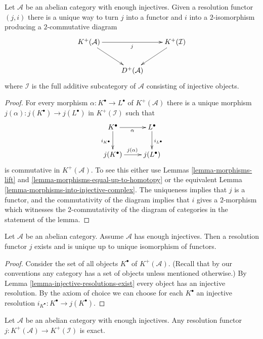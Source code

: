 \begin{lemma}
\label{lemma-resolution-functor}
Let $\mathcal{A}$ be an abelian category with enough injectives.
Given a resolution functor $(j, i)$ there is a unique way to
turn $j$ into a functor and $i$ into a $2$-isomorphism
producing a $2$-commutative diagram
$$
\xymatrix{
K^{+}(\mathcal{A}) \ar[rd] \ar[rr]_j & & K^{+}(\mathcal{I}) \ar[ld] \\
& D^{+}(\mathcal{A})
}
$$
where $\mathcal{I}$ is the full additive subcategory of $\mathcal{A}$
consisting of injective objects.
\end{lemma}

\begin{proof}
For every morphism $\alpha : K^\bullet \to L^\bullet$ of $K^{+}(\mathcal{A})$
there is a unique morphism
$j(\alpha) : j(K^\bullet) \to j(L^\bullet)$ in $K^{+}(\mathcal{I})$
such that
$$
\xymatrix{
K^\bullet \ar[r]_\alpha \ar[d]_{i_{K^\bullet}} &
L^\bullet \ar[d]^{i_{L^\bullet}} \\
j(K^\bullet) \ar[r]^{j(\alpha)} & j(L^\bullet)
}
$$
is commutative in $K^{+}(\mathcal{A})$. To see this either use
Lemmas \ref{lemma-morphisms-lift} and
\ref{lemma-morphisms-equal-up-to-homotopy}
or the equivalent
Lemma \ref{lemma-morphisms-into-injective-complex}.
The uniqueness implies that $j$ is a functor, and the commutativity of
the diagram implies that $i$ gives a $2$-morphism which witnesses the
$2$-commutativity of the diagram of categories in the statement of
the lemma.
\end{proof}

\begin{lemma}
\label{lemma-into-derived-category}
Let $\mathcal{A}$ be an abelian category.
Assume $\mathcal{A}$ has enough injectives.
Then a resolution functor $j$ exists and is 
unique up to unique isomorphism of functors.
\end{lemma}

\begin{proof}
Consider the set of all objects $K^\bullet$ of $K^{+}(\mathcal{A})$.
(Recall that by our conventions any category has a set of
objects unless mentioned otherwise.)
By Lemma \ref{lemma-injective-resolutions-exist} every object
has an injective resolution.
By the axiom of choice we can choose for each $K^\bullet$
an injective resolution $i_{K^\bullet} : K^\bullet \to j(K^\bullet)$.
\end{proof}

\begin{lemma}
\label{lemma-j-is-exact}
Let $\mathcal{A}$ be an abelian category with enough injectives.
Any resolution functor
$j : K^{+}(\mathcal{A}) \to K^{+}(\mathcal{I})$
is exact.
\end{lemma}

